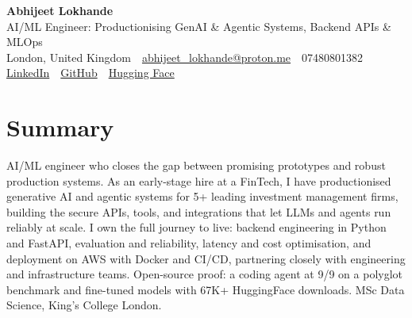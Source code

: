 \documentclass[10pt,a4paper]{article}
\newcommand{\sep}{\,\textcolor{accent!60}{\textbar}\,}
\begin{document}
\begin{center}
  {\fontsize{24}{26}\selectfont\bfseries Abhijeet Lokhande}\\[3pt]
  {\color{accent}\large AI/ML Engineer: Productionising GenAI \& Agentic Systems, Backend APIs \& MLOps}\\[5pt]
  {\small
    London, United Kingdom \sep
    \href{mailto:abhijeet_lokhande@proton.me}{abhijeet\_lokhande@proton.me} \sep
    07480801382 \\[2pt]
    \href{https://www.linkedin.com/in/ablds/}{LinkedIn} \sep
    \href{https://github.com/abhijeetscode}{GitHub} \sep
    \href{https://huggingface.co/ab-ai}{Hugging Face}
  }
\end{center}
\vspace{2pt}

\section{Summary}
AI/ML engineer who closes the gap between promising prototypes and robust production systems. As an early-stage hire at a FinTech, I have productionised generative AI and agentic systems for 5+ leading investment management firms, building the secure APIs, tools, and integrations that let LLMs and agents run reliably at scale. I own the full journey to live: backend engineering in Python and FastAPI, evaluation and reliability, latency and cost optimisation, and deployment on AWS with Docker and CI/CD, partnering closely with engineering and infrastructure teams. Open-source proof: a coding agent at 9/9 on a polyglot benchmark and fine-tuned models with 67K+ HuggingFace downloads. MSc Data Science, King's College London.

\end{document}
